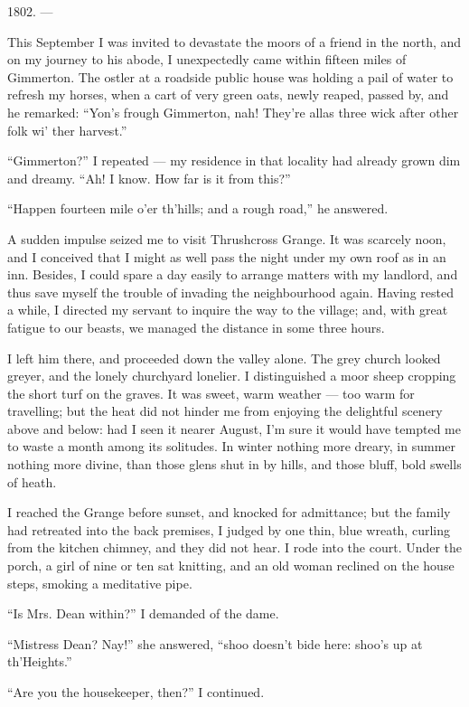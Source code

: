\par 1802. —
\par This September I was invited to devastate the moors of a friend in the north, and on my journey to his abode, I unexpectedly came within fifteen miles of Gimmerton. The ostler at a roadside public house was holding a pail of water to refresh my horses, when a cart of very green oats, newly reaped, passed by, and he remarked: “Yon's frough Gimmerton, nah! They're allas three wick after other folk wi' ther harvest.”
\par “Gimmerton?” I repeated — my residence in that locality had already grown dim and dreamy. “Ah! I know. How far is it from this?”
\par “Happen fourteen mile o'er th'hills; and a rough road,” he answered.
\par A sudden impulse seized me to visit Thrushcross Grange. It was scarcely noon, and I conceived that I might as well pass the night under my own roof as in an inn. Besides, I could spare a day easily to arrange matters with my landlord, and thus save myself the trouble of invading the neighbourhood again. Having rested a while, I directed my servant to inquire the way to the village; and, with great fatigue to our beasts, we managed the distance in some three hours.
\par I left him there, and proceeded down the valley alone. The grey church looked greyer, and the lonely churchyard lonelier. I distinguished a moor sheep cropping the short turf on the graves. It was sweet, warm weather — too warm for travelling; but the heat did not hinder me from enjoying the delightful scenery above and below: had I seen it nearer August, I'm sure it would have tempted me to waste a month among its solitudes. In winter nothing more dreary, in summer nothing more divine, than those glens shut in by hills, and those bluff, bold swells of heath.
\par I reached the Grange before sunset, and knocked for admittance; but the family had retreated into the back premises, I judged by one thin, blue wreath, curling from the kitchen chimney, and they did not hear. I rode into the court. Under the porch, a girl of nine or ten sat knitting, and an old woman reclined on the house steps, smoking a meditative pipe.
\par “Is Mrs. Dean within?” I demanded of the dame.
\par “Mistress Dean? Nay!” she answered, “shoo doesn't bide here: shoo's up at th'Heights.”
\par “Are you the housekeeper, then?” I continued.
